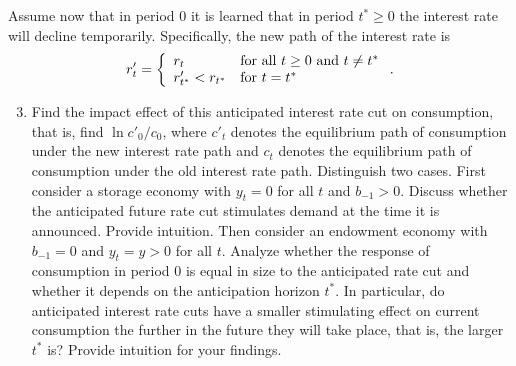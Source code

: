 \begin{exercise}
Assume now that in period 0 it is learned that in period $t^*\ge 0$ the interest rate will decline temporarily. Specifically, the new path of the interest rate is
\[
r'_t = \left\{
 \begin{array}{ll}
r_t &\mbox{for all  $t\ge 0$ and $t \neq t^*$}\\
r'_{t^*}<r_{t^*} &\mbox{for $ t=t^*$}\\
\end{array}
\right.
.
\]
\begin{enumerate}\setcounter{enumi}{2}
\item Find the impact effect of this anticipated interest rate cut on consumption, that is, find $\ln c'_0/c_0$, where $c'_t$ denotes the equilibrium path of consumption under the new interest rate path and $c_t$ denotes the equilibrium path of consumption under the old interest rate path. 
 Distinguish two cases. First consider  a storage economy with $y_t=0$ for all $t$ and $b_{-1}>0$. 
Discuss whether the anticipated future rate cut stimulates demand at the time it is announced. Provide intuition. Then consider an endowment economy with $b_{-1}=0$ and $y_t=y>0$ for all $t$.  Analyze whether the response of consumption in period 0 is equal in size to the anticipated rate cut and whether it  depends on the anticipation horizon $t^*$. In particular, do anticipated interest rate cuts have a smaller stimulating effect on current consumption the further in the future they will take place, that is, the larger $t^*$ is? Provide intuition for your findings. 


\end{enumerate}
\end{exercise}
